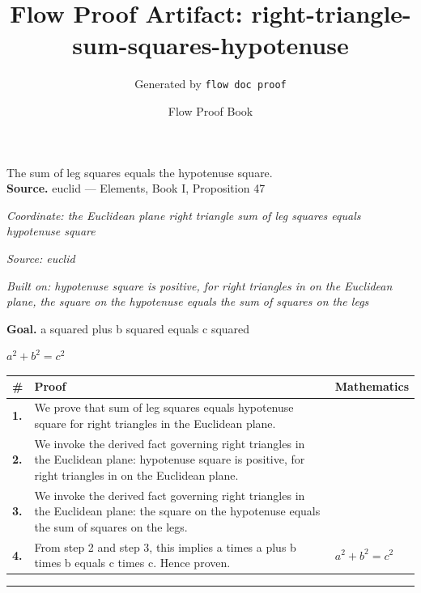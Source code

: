 \documentclass[11pt]{article}
\title{Flow Proof Artifact: right-triangle-sum-squares-hypotenuse}
\author{Generated by \texttt{flow doc proof}}
\date{Flow Proof Book}
\theoremstyle{definition}
\begin{document}
\maketitle
The sum of leg squares equals the hypotenuse square.\\[0.5em]
\textbf{Source.} euclid — Elements, Book I, Proposition 47\\[0.5em]
\bigskip
{}\par
\smallskip\noindent\textit{Coordinate: the Euclidean plane \cdot right triangle \cdot sum of leg squares equals hypotenuse square}\par
\smallskip\noindent\textit{Source: euclid}\par
\smallskip\noindent\textit{Built on: hypotenuse square is positive, for right triangles in on the Euclidean plane, the square on the hypotenuse equals the sum of squares on the legs}\par
\medskip
\noindent\textbf{Goal.} a squared plus b squared equals c squared\par
\noindent$\displaystyle a^{2} + b^{2} = c^{2}$\par
\medskip
\noindent
\begin{tabular}{@{} >{\raggedright\arraybackslash}p{} >{\raggedright\arraybackslash}p{} >{\raggedleft\arraybackslash}p{} @{}}
\textbf{\#} & \textbf{Proof} & \textbf{Mathematics} \\
\midrule
\textbf{1.} & We prove that sum of leg squares equals hypotenuse square for right triangles in the Euclidean plane. & \\[0.45em]
\textbf{2.} & We invoke the derived fact governing right triangles in the Euclidean plane: hypotenuse square is positive, for right triangles in on the Euclidean plane. & \\[0.45em]
\textbf{3.} & We invoke the derived fact governing right triangles in the Euclidean plane: the square on the hypotenuse equals the sum of squares on the legs. & \\[0.45em]
\textbf{4.} & From step 2 and step 3, this implies a times a plus b times b equals c times c. Hence proven. & $\displaystyle a^{2} + b^{2} = c^{2}$ \\[0.45em]
\bottomrule
\end{tabular}
\label{thm:Geometry-right triangle-sum_of_leg_squares_equals_hypotenuse_square}
\par\medskip\hrule
\end{document}
